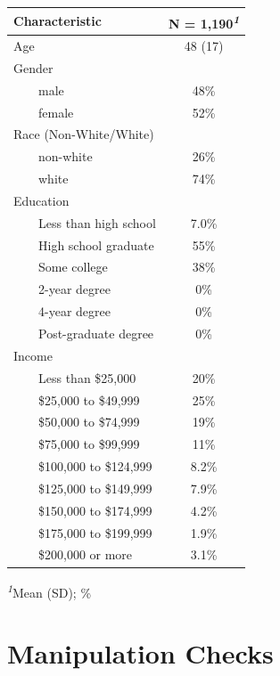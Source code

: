 \documentclass[
]{article}
\begin{document}
\begin{table}
\fontsize{12.0pt}{14.4pt}\selectfont
\begin{tabular*}{\linewidth}{@{\extracolsep{\fill}}lc}
\toprule
\textbf{Characteristic} & \textbf{N = 1,190}\textsuperscript{\textit{1}} \\ 
\midrule\addlinespace[2.5pt]
Age & 48 (17) \\ 
Gender &  \\ 
    male & 48\% \\ 
    female & 52\% \\ 
Race (Non-White/White) &  \\ 
    non-white & 26\% \\ 
    white & 74\% \\ 
Education &  \\ 
    Less than high school & 7.0\% \\ 
    High school graduate & 55\% \\ 
    Some college & 38\% \\ 
    2-year degree & 0\% \\ 
    4-year degree & 0\% \\ 
    Post-graduate degree & 0\% \\ 
Income &  \\ 
    Less than \$25,000 & 20\% \\ 
    \$25,000 to \$49,999 & 25\% \\ 
    \$50,000 to \$74,999 & 19\% \\ 
    \$75,000 to \$99,999 & 11\% \\ 
    \$100,000 to \$124,999 & 8.2\% \\ 
    \$125,000 to \$149,999 & 7.9\% \\ 
    \$150,000 to \$174,999 & 4.2\% \\ 
    \$175,000 to \$199,999 & 1.9\% \\ 
    \$200,000 or more & 3.1\% \\ 
\bottomrule
\end{tabular*}
\begin{minipage}{\linewidth}
\textsuperscript{\textit{1}}Mean (SD); \%\\
\end{minipage}
\end{table}

\hypertarget{manipulation-checks}{%
\section{Manipulation Checks}\label{manipulation-checks}}
\end{document}
